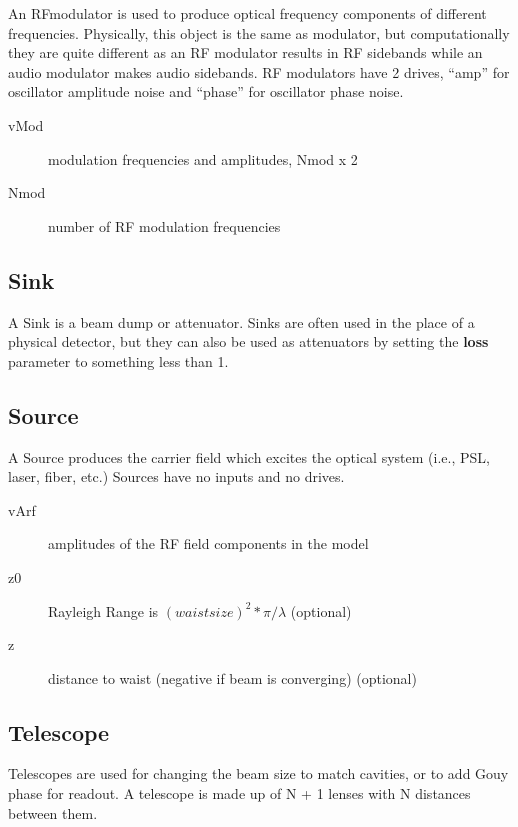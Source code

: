 \documentclass[12pt]{article}
\begin{document}
An RFmodulator is used to produce optical frequency components of different frequencies.
Physically, this object is the same as modulator, but computationally they are quite different as an RF modulator results in RF sidebands while an audio modulator makes audio sidebands.
RF modulators have 2 drives, ``amp'' for oscillator amplitude noise and ``phase'' for oscillator phase noise.

\begin{description}
  \item[vMod] modulation frequencies and amplitudes, Nmod x 2
  \item[Nmod] number of RF modulation frequencies
\end{description}

\subsection{Sink}

A Sink is a beam dump or attenuator.
Sinks are often used in the place of a physical detector, but they can also be used as attenuators by setting the {\bf loss} parameter to something less than 1.

\subsection{Source}

A Source produces the carrier field which excites the optical system (i.e., PSL, laser, fiber, etc.)
Sources have no inputs and no drives.

\begin{description}
  \item[vArf] amplitudes of the RF field components in the model
  \item[z0] Rayleigh Range is $(waist size)^2 * \pi / \lambda$ (optional)\\
  \item[z] distance to waist (negative if beam is converging) (optional)\\
\end{description}

\subsection{Telescope}

Telescopes are used for changing the beam size to match cavities, or to add Gouy phase for readout.
A telescope is made up of N + 1 lenses with N distances between them.
\end{document}

